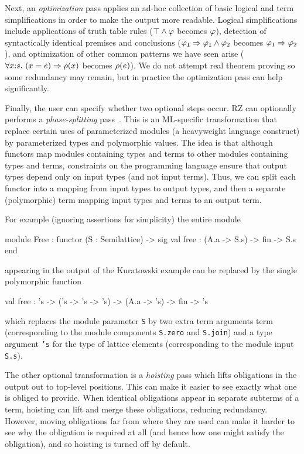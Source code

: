 Next, an \emph{optimization} pass applies an ad-hoc collection of
basic logical and term simplifications in order to make the output more readable. 
Logical simplifications include applications of truth table rules
($\top\land \varphi$ becomes $\varphi$), detection of syntactically
identical premises and conclusions
($\varphi_1\Rightarrow \varphi_1\land \varphi_2$ becomes
$\varphi_1\Rightarrow \varphi_2$), and optimization of other common patterns we have
seen arise
($\forall x{:}s.\ (x = e)\Rightarrow \rho(x)$ becomes
$\rho(e)$). We do not attempt real theorem proving 
so some redundancy may remain, but in practice the optimization pass
can help significantly.

Finally, the user can specify whether two optional steps occur.
RZ can optionally performs a \emph{phase-splitting} pass~\cite{harper+:popl90}. 
This is an ML-specific transformation that replace certain
uses of parameterized modules (a heavyweight language construct) by
parameterized types and polymorphic values. The idea is that although
functors map modules containing types and terms to other modules containing types
and terms, constraints on the programming language ensure that output types
depend only on input types (and not input terms).  Thus, we can split each
functor into a mapping from input types to output types, and then a separate
(polymorphic) term mapping input types and terms to an output term.

For example (ignoring
assertions for simplicity) the entire module
\begin{source}
module Free : functor (S : Semilattice) ->
                    sig
                      val free : (A.a -> S.s) -> fin -> S.s
                    end	
\end{source}   
appearing in the output of the Kuratowski example can be replaced by the single polymorphic function
\begin{source}
val free : 's -> ('s -> 's -> 's) -> (A.a -> 's) -> fin -> 's	
\end{source}
which replaces the module parameter \texttt{S} by two extra term arguments term (corresponding to the module components \texttt{S.zero} and \texttt{S.join}) 
and a type argument \texttt{'s} for the type of lattice elements (corresponding to the module input \texttt{S.s}).

The other optional transformation is a \emph{hoisting} pass which lifts obligations in the output out to top-level positions.  This can make it easier to see exactly what one is obliged to provide.  When identical obligations appear in separate subterms of a term, hoisting can lift and merge these obligations, reducing redundancy.  However, moving obligations far from where they are used can make it harder to see why the obligation is required at all (and hence how one might satisfy the obligation), and so hoisting is turned off by default.

